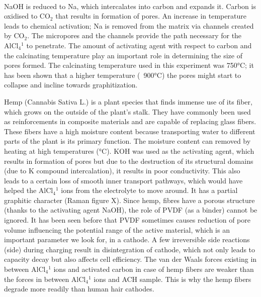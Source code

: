 \documentclass{article}
\begin{document}
\\NaOH is reduced to Na, which intercalates into carbon and expands it. Carbon is oxidised to CO$_2$ that results in formation of pores. An increase in temperature leads to chemical activation; Na is removed from the matrix via channels created by CO$_2$. The micropores and the channels provide the path necessary for the AlCl$_4{^1}$ to penetrate. The amount of activating agent with respect to carbon and the calcinating temperature play an important role in determining the size of pores formed. The calcinating temperature used in this experiment was 750°C; it has been shown that a higher temperature (~900°C) the pores might start to collapse and incline towards graphitization. 

Hemp (Cannabis Sativa L.) is a plant species that finds immense use of its fiber, which grows on the outside of the plant’s stalk. They have commonly been used as reinforcements in composite materials and are capable of replacing glass fibers. These fibers have a high moisture content because transporting water to different parts of the plant is its primary function. The moisture content can removed by heating at high temperatures (°C). KOH was used as the activating agent, which results in formation of pores but due to the destruction of its structural domains (due to K compound intercalation), it results in poor conductivity. This also leads to a certain loss of smooth inner transport pathways, which would have helped the AlCl$_4{^1}$ ions from the electrolyte to move around. It has a partial graphitic character (Raman figure X). Since hemp, fibres have a porous structure (thanks to the activating agent NaOH), the role of PVDF (as a binder) cannot be ignored. It has been seen before that PVDF sometimes causes reduction of pore volume influencing the potential range of the active material, which is an important parameter we look for, in a cathode. A few irreversible side reactions (side) during charging result in disintegration of cathode, which not only leads to capacity decay but also affects cell efficiency. The van der Waals forces existing in between AlCl$_4{^1}$ ions and activated carbon in case of hemp fibers are weaker than the forces in between AlCl$_4{^1}$ ions and ACH sample. This is why the hemp fibers degrade more readily than human hair cathodes. 
\end{document}
